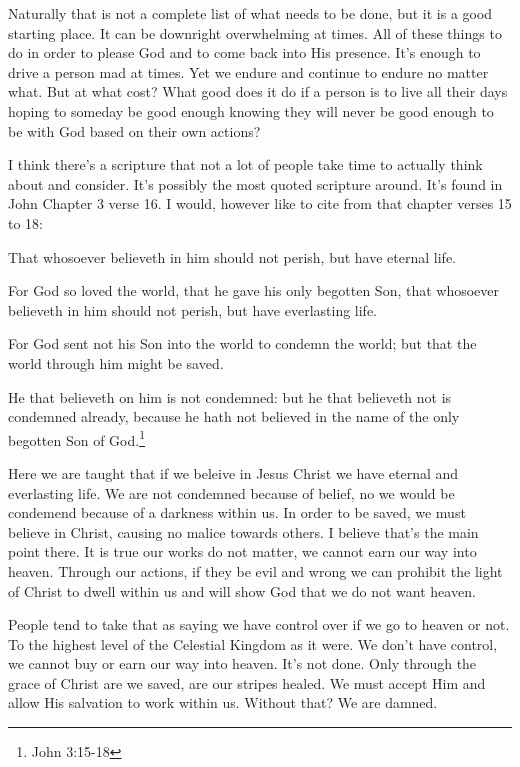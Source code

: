Naturally that is not a complete list of what needs to be done, but it is a good
starting place. It can be downright overwhelming at times. All of these things to do
in order to please God and to come back into His presence. It's enough to drive a
person mad at times. Yet we endure and continue to endure no matter what. But at what
cost? What good does it do if a person is to live all their days hoping to someday be
good enough knowing they will never be good enough to be with God based on their own
actions?

I think there's a scripture that not a lot of people take time to actually think
about and consider. It's possibly the most quoted scripture around. It's found in
John Chapter 3 verse 16. I would, however like to cite from that chapter verses
15 to 18:

\begin{displayquote}
That whosoever believeth in him should not perish, but have eternal life.

For God so loved the world, that he gave his only begotten Son, that whosoever 
believeth in him should not perish, but have everlasting life.

For God sent not his Son into the world to condemn the world; but that the 
world through him might be saved.

He that believeth on him is not condemned: but he that believeth not is 
condemned already, because he hath not believed in the name of the only begotten 
Son of God.\footnote{John 3:15-18}
\end{displayquote}

Here we are taught that if we beleive in Jesus Christ we have eternal and everlasting
life. We are not condemned because of belief, no we would be condemend because of a
darkness within us. In order to be saved, we must believe in Christ, causing no
malice towards others. I believe that's the main point there. It is true our works do
not matter, we cannot earn our way into heaven. Through our actions, if they be evil
and wrong we can prohibit the light of Christ to dwell within us and will show God
that we do not want heaven.

People tend to take that as saying we have control over if we go to heaven or not. To
the highest level of the Celestial Kingdom as it were. We don't have control, we
cannot buy or earn our way into heaven. It's not done. Only through the grace of
Christ are we saved, are our stripes healed. We must accept Him and allow His
salvation to work within us. Without that? We are damned.


